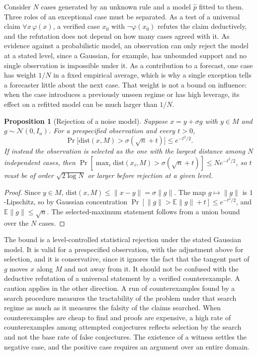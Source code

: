 \documentclass[11pt,a4paper]{article}
\newtheorem{proposition}[theorem]{Proposition}
\theoremstyle{definition}
\theoremstyle{remark}
\newcommand{\dist}{\mathrm{dist}}
\begin{document}
Consider $N$ cases generated by an unknown rule and a model $\hat p$ fitted to
them. Three roles of an exceptional case must be separated. As a test of a
universal claim $\forall x\,\varphi(x)$, a verified case $x_0$ with
$\neg\varphi(x_0)$ refutes the claim deductively, and the refutation does not
depend on how many cases agreed with it. As evidence against a probabilistic
model, an observation can only reject the model at a stated level, since a
Gaussian, for example, has unbounded support and no single observation is
impossible under it. As a contribution to a forecast, one case has weight
$1/N$ in a fixed empirical average, which is why a single exception tells a
forecaster little about the next case. That weight is not a bound on
influence: when the case introduces a previously unseen regime or has high
leverage, its effect on a refitted model can be much larger than $1/N$.

\begin{proposition}[Rejection of a noise model]\label{prop:witness}
Suppose $x=y+\sigma g$ with $y\in M$ and $g\sim\mathcal{N}(0,I_n)$. For a
prespecified observation and every $t>0$,
\[
\Pr\bigl[\dist(x,M)>\sigma(\sqrt n+t)\bigr]\le e^{-t^2/2}.
\]
If instead the observation is selected as the one with the largest distance
among $N$ independent cases, then
$\Pr[\max_i\dist(x_i,M)>\sigma(\sqrt n+t)]\le N e^{-t^2/2}$, so $t$ must be
of order $\sqrt{2\log N}$ or larger before rejection at a given level.
\end{proposition}

\begin{proof}
Since $y\in M$, $\dist(x,M)\le\|x-y\|=\sigma\|g\|$. The map $g\mapsto\|g\|$ is
$1$-Lipschitz, so by Gaussian concentration
$\Pr[\|g\|>\mathbb{E}\|g\|+t]\le e^{-t^2/2}$, and $\mathbb{E}\|g\|\le\sqrt n$.
The selected-maximum statement follows from a union bound over the $N$ cases.
\end{proof}

The bound is a level-controlled statistical rejection under the stated
Gaussian model. It is valid for a prespecified observation, with the
adjustment above for selection, and it is conservative, since it ignores the
fact that the tangent part of $g$ moves $x$ along $M$ and not away from it. It
should not be confused with the deductive refutation of a universal statement
by a verified counterexample. A caution applies in the other direction. A run
of counterexamples found by a search procedure measures the tractability of
the problem under that search regime as much as it measures the falsity of
the claims searched. When counterexamples are cheap to find and proofs are
expensive, a high rate of counterexamples among attempted conjectures
reflects selection by the search and not the base rate of false conjectures.
The existence of a witness settles the negative case, and the positive case
requires an argument over an entire domain.
\end{document}
